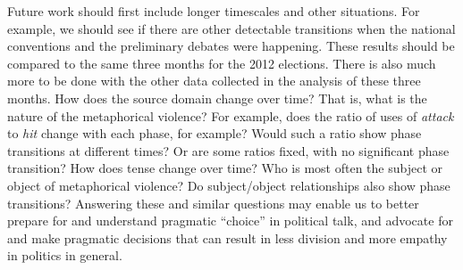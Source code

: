Future work should first include longer timescales and other situations. For
example, we should see if there are other detectable transitions when the national 
conventions and the preliminary debates were happening. These results 
should be compared to the same three months for the 2012 elections. There is
also much more to be done with the other data collected in the analysis of 
these three months. How does the source domain change over time? That is, 
what is the nature of the metaphorical violence? For example, does
the ratio of uses of \textit{attack} to \textit{hit} change
with each phase, for example? Would such a ratio show phase transitions
at different times? Or are some ratios fixed, with no significant phase
transition? How does tense change over time? Who is most often the subject
or object of metaphorical violence? Do subject/object relationships also
show phase transitions? Answering these and similar questions may enable us
to better prepare for and understand pragmatic ``choice'' in political talk, 
and advocate for and make pragmatic decisions that can result in less division
and more empathy in politics in general.
